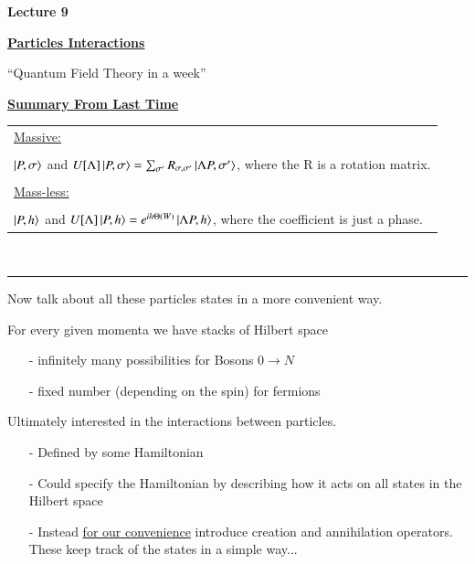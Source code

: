 \def\adagger{\ensuremath{a_{p\sigma}^\dagger}}


\usepackage{fancyhdr}

\fancyhf{}


\thispagestyle{fancy}

\begin{center}
{\huge \textbf{Lecture 9}}
\end{center}

{\fontsize{14}{16}\selectfont

\textbf{\underline{Particles Interactions}} 

``Quantum Field Theory in a week''

{\Large \underline{\textbf{Summary From Last Time}}}

\begin{tabular}{l}
\underline{Massive:}\\
\\
\hspace{0.5in}$\ket{P, \sigma}$ and $U[\Lambda] \ket{P, \sigma} = \sum_{\sigma'} R_{\sigma,\sigma'} \ket{\Lambda P, \sigma'}$, where the R is a rotation matrix.\\
\\
\underline{Mass-less:}\\
\\
\hspace{0.5in}$\ket{P, h}$ and $U[\Lambda] \ket{P, h} = e^{ih\Theta(W)}\ket{\Lambda P, h}$, where the coefficient is just a phase.\\
\end{tabular}\\

\noindent\rule{\textwidth}{1pt}
Now talk about all these particles states in a more convenient way.  

For every given momenta we have stacks of Hilbert space
\begin{itemize}
\item[-] infinitely many possibilities for Bosons $0\rightarrow N$
\item[-] fixed number (depending on the spin) for fermions
\end{itemize}

\vspace{0.5in}
Ultimately interested in the interactions between particles. 
\begin{itemize}
\item[-] Defined by some Hamiltonian        
\item[-] Could specify the Hamiltonian by describing how it acts on all states in the Hilbert space
\item[-] Instead \underline{for our convenience} introduce creation and annihilation operators.
These keep track of the states in a simple way...
\end{itemize}

}
